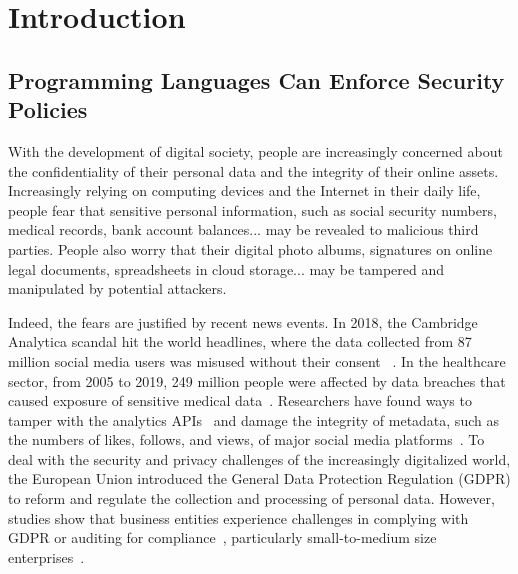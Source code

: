\chapter{Introduction}
\label{ch:intro}

\section{Programming Languages Can Enforce Security Policies}

With the development of digital society, people are increasingly concerned about
the confidentiality of their personal data and the integrity of their online
assets. Increasingly relying on computing devices and the Internet in their
daily life, people fear that sensitive personal information, such as social
security numbers, medical records, bank account balances... may be revealed to
malicious third parties. People also worry that their digital photo albums,
signatures on online legal documents, spreadsheets in cloud storage... may be
tampered and manipulated by potential attackers.

Indeed, the fears are justified by recent news events. In 2018, the Cambridge
Analytica scandal hit the world headlines, where the data collected from 87
million social media users was misused without their consent
~\parencite{cadwalladr2018facebook,kitchgaessner2017cambridge,gonzalez2019global,hinds2020wouldn}.
In the healthcare sector, from 2005 to 2019, 249 million people were
affected by data breaches that caused exposure of sensitive medical
data~\parencite{seh2020healthcare}. Researchers have found ways to tamper with the
analytics APIs~\parencite{pfeffer2018tampering} and damage the integrity of
metadata, such as the numbers of likes, follows, and views, of major social
media platforms~\parencite{paquet2017can}. To deal with the security and privacy
challenges of the increasingly digitalized world, the European Union introduced
the General Data Protection Regulation (GDPR) to reform and regulate the
collection and processing of personal data. However, studies show that business
entities experience challenges in complying with GDPR or auditing for
compliance~\parencite{smirnova2024understanding}, particularly small-to-medium
size enterprises~\parencite{sirur2018we,freitas2018gdpr,harting2021impacts}.

